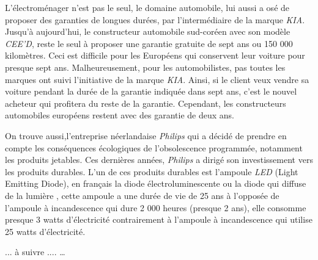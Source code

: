 \smallbreak
L’électroménager n'est pas le seul, le domaine automobile, lui aussi a osé de proposer  des garanties de longues durées, par l’intermédiaire de la marque \textit{KIA}. Jusqu’à aujourd'hui, le constructeur automobile sud-coréen avec son modèle \textit{CEE’D}, reste le seul à proposer une garantie gratuite de sept ans ou 150 000 kilomètres. Ceci est difficile pour les Européens qui conservent leur voiture pour presque sept ans. Malheureusement, pour les automobilistes, pas toutes les marques ont suivi l’initiative de la marque \textit{KIA}. Ainsi, si le client veux vendre sa voiture pendant la durée de la garantie indiquée dans sept ans, c'est le nouvel acheteur qui profitera du reste de la garantie. Cependant, les constructeurs automobiles européens restent avec des garantie de deux ans.


\smallbreak
On trouve aussi,l'entreprise néerlandaise \textit{Philips} qui a décidé de prendre en compte les conséquences écologiques de l'obsolescence programmée, notamment les produits jetables. Ces dernières années, \textit{Philips} a dirigé son investissement vers  les produits durables. L'un de ces produits durables est l’ampoule \textit{LED} (Light Emitting Diode), en français la diode électroluminescente ou la diode qui  diffuse de la lumière , cette ampoule a une durée de vie de 25 ans à l'opposée de l'ampoule à incandescence qui dure 2 000 heures (presque 2 ans), elle consomme presque 3 watts d’électricité contrairement à l'ampoule à incandescence qui utilise 25 watts d’électricité. 

... à suivre ....
… 
